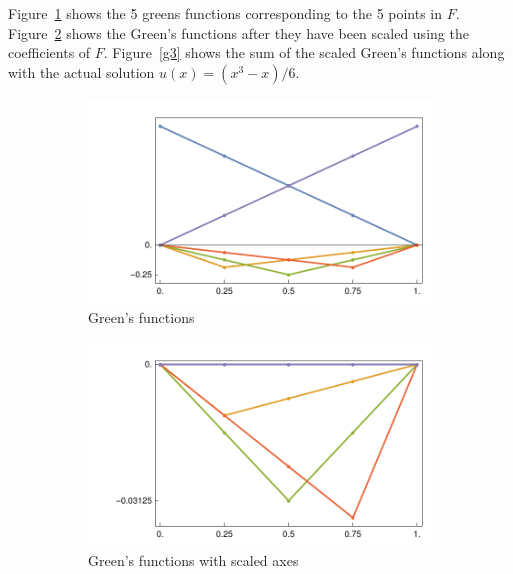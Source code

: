 \documentclass[10pt]{article}
\begin{document}
\begin{solution}[Solution]
\begin{enumerate}
       Figure~\ref{g1} shows the 5 greens functions corresponding to the 5 points in \( F \). Figure~\ref{g2} shows the Green's functions after they have been scaled using the coefficients of \( F \). Figure~\ref{g3} shows the sum of the scaled Green's functions along with the actual solution \( u(x) = (x^3-x)/6 \).
        \begin{figure}[H]\centering
            \begin{subfigure}{.49\textwidth}\centering
                \includegraphics[width=\textwidth]{img/g1.pdf}
                \caption{Green's functions}
                \label{g1}
            \end{subfigure}
            \begin{subfigure}{.49\textwidth}\centering
                \includegraphics[width=\textwidth]{img/g2.pdf}
                \caption{Green's functions with scaled axes}
                \label{g2}
            \end{subfigure}
            \begin{subfigure}{.49\textwidth}\centering

\end{subfigure}
\end{figure}
\end{enumerate}
\end{solution}
\end{document}
